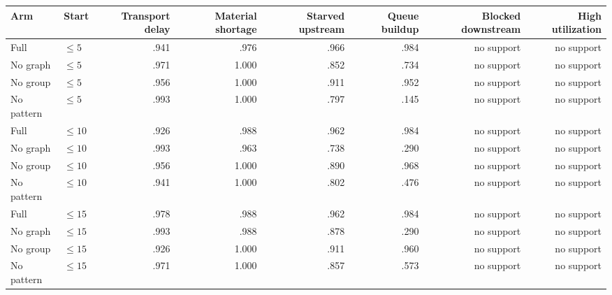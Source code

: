 \documentclass[10pt,a4paper]{article}
\begin{document}
\begin{landscape}
\begin{center}
\scriptsize
\begin{tabular}{llrrrrrr}
\toprule
Arm & Start & Transport delay & Material shortage & Starved upstream &
Queue buildup & Blocked downstream & High utilization \\
\midrule
Full     & $\leq5$  & .941 & .976 & .966 & .984 & no support & no support \\
No graph & $\leq5$  & .971 & 1.000 & .852 & .734 & no support & no support \\
No group & $\leq5$  & .956 & 1.000 & .911 & .952 & no support & no support \\
No pattern & $\leq5$  & .993 & 1.000 & .797 & .145 & no support & no support \\
\midrule
Full     & $\leq10$ & .926 & .988 & .962 & .984 & no support & no support \\
No graph & $\leq10$ & .993 & .963 & .738 & .290 & no support & no support \\
No group & $\leq10$ & .956 & 1.000 & .890 & .968 & no support & no support \\
No pattern & $\leq10$ & .941 & 1.000 & .802 & .476 & no support & no support \\
\midrule
Full     & $\leq15$ & .978 & .988 & .962 & .984 & no support & no support \\
No graph & $\leq15$ & .993 & .988 & .878 & .290 & no support & no support \\
No group & $\leq15$ & .926 & 1.000 & .911 & .960 & no support & no support \\
No pattern & $\leq15$ & .971 & 1.000 & .857 & .573 & no support & no support \\
\bottomrule
\end{tabular}
\end{center}
\end{landscape}
\end{document}
